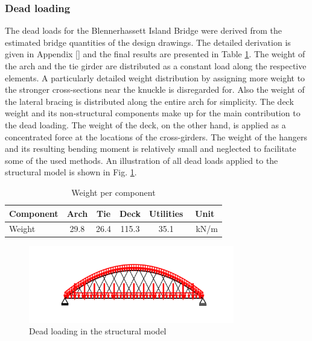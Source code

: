 \subsubsection{Dead loading}
The dead loads for the Blennerhassett Island Bridge were derived from the estimated bridge quantities of the design drawings. The detailed derivation is given in Appendix [] and the final results are presented in Table \ref{tab:dead_loads}. The weight of the arch and the tie girder are distributed as a constant load along the respective elements. A particularly detailed weight distribution by assigning more weight to the stronger cross-sections near the knuckle is disregarded for. Also the weight of the lateral bracing is distributed along the entire arch for simplicity. The deck weight and its non-structural components make up for the main contribution to the dead loading. The weight of the deck, on the other hand, is applied as a concentrated force at the locations of the cross-girders. The weight of the hangers and its resulting bending moment is relatively small and neglected to facilitate some of the used methods. An illustration of all dead loads applied to the structural model is shown in Fig. \ref{fig:dead_loads}.

\begin{table}[H]
    \centering
    \begin{tabular}{lccccc}
        Component & Arch & Tie & Deck & Utilities & Unit \\ \hline
        Weight & 29.8 & 26.4 & 115.3 & 35.1 & \SI{}{kN/m}
    \end{tabular}
    \caption{Weight per component}
    \label{tab:dead_loads}
\end{table}

\begin{figure}[H]
    \centering
    \includegraphics[trim={0 0.8cm 0 0.8cm},clip,
    width=0.8\textwidth]{illustrations/model overview/permanent loads.png}
    \caption{Dead loading in the structural model}
    \label{fig:dead_loads}
\end{figure}

